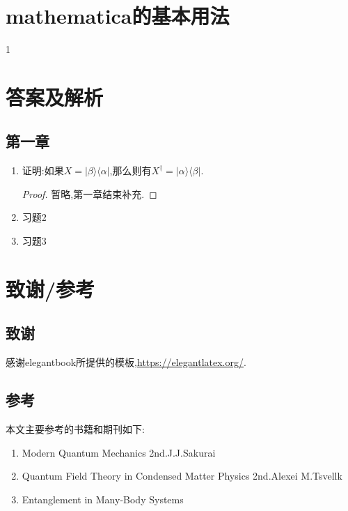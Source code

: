 \documentclass[lang=cn,newtx,10pt,scheme=chinese,thmcnt=section]{elegantbook}
\begin{document}
\chapter{mathematica的基本用法}
1
\chapter{答案及解析}
\section*{第一章}
\begin{enumerate}
	\item 证明:如果$X=|\beta\rangle\langle\alpha|$,那么则有$X^\dagger=|\alpha\rangle\langle\beta|$.
	\begin{proof}
		暂略,第一章结束补充.
	\end{proof}
	\item 习题2
	\item 习题3
\end{enumerate}
\chapter{致谢/参考}
\section{致谢}
感谢elegantbook所提供的模板,\href{https://elegantlatex.org/}{https://elegantlatex.org/}.\\

\section{参考}
本文主要参考的书籍和期刊如下:
\begin{enumerate}
	\item Modern Quantum Mechanics 2nd.J.J.Sakurai
	\item Quantum Field Theory in Condensed Matter Physics 2nd.Alexei M.Tsvellk
	\item Entanglement in Many-Body Systems
\end{enumerate}
\end{document}
